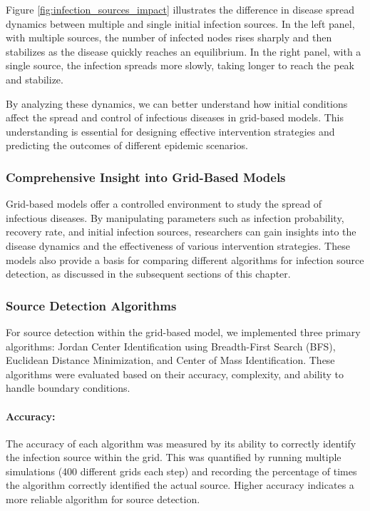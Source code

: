 \noindent
Figure \ref{fig:infection_sources_impact} illustrates the difference in disease spread dynamics between multiple and single initial infection sources. In the left panel, with multiple sources, the number of infected nodes rises sharply and then stabilizes as the disease quickly reaches an equilibrium. In the right panel, with a single source, the infection spreads more slowly, taking longer to reach the peak and stabilize.

By analyzing these dynamics, we can better understand how initial conditions affect the spread and control of infectious diseases in grid-based models. This understanding is essential for designing effective intervention strategies and predicting the outcomes of different epidemic scenarios.

\subsubsection{Comprehensive Insight into Grid-Based Models}
Grid-based models offer a controlled environment to study the spread of infectious diseases. By manipulating parameters such as infection probability, recovery rate, and initial infection sources, researchers can gain insights into the disease dynamics and the effectiveness of various intervention strategies. These models also provide a basis for comparing different algorithms for infection source detection, as discussed in the subsequent sections of this chapter.

\subsubsection{Source Detection Algorithms}
For source detection within the grid-based model, we implemented three primary algorithms: Jordan Center Identification using Breadth-First Search (BFS), Euclidean Distance Minimization, and Center of Mass Identification. These algorithms were evaluated based on their accuracy, complexity, and ability to handle boundary conditions.

\paragraph{Accuracy:}
The accuracy of each algorithm was measured by its ability to correctly identify the infection source within the grid. This was quantified by running multiple simulations (400 different grids each step) and recording the percentage of times the algorithm correctly identified the actual source. Higher accuracy indicates a more reliable algorithm for source detection.

